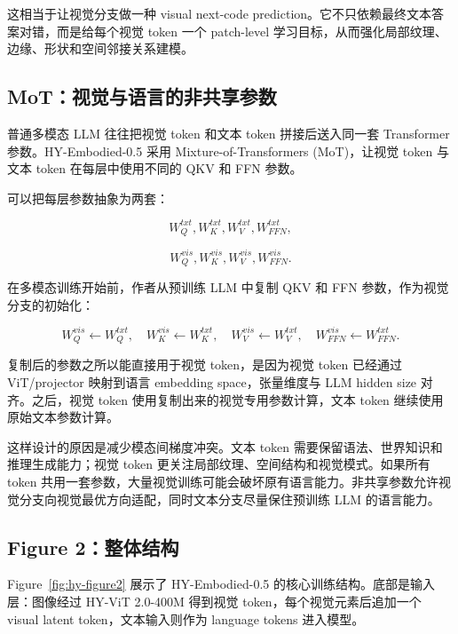 这相当于让视觉分支做一种 visual next-code prediction。它不只依赖最终文本答案对错，而是给每个视觉 token 一个 patch-level 学习目标，从而强化局部纹理、边缘、形状和空间邻接关系建模。

\subsection{MoT：视觉与语言的非共享参数}

普通多模态 LLM 往往把视觉 token 和文本 token 拼接后送入同一套 Transformer 参数。HY-Embodied-0.5 采用 Mixture-of-Transformers (MoT)，让视觉 token 与文本 token 在每层中使用不同的 QKV 和 FFN 参数。

可以把每层参数抽象为两套：

\begin{equation}
    W_Q^{txt}, W_K^{txt}, W_V^{txt}, W_{FFN}^{txt},
\end{equation}

\begin{equation}
    W_Q^{vis}, W_K^{vis}, W_V^{vis}, W_{FFN}^{vis}.
\end{equation}

在多模态训练开始前，作者从预训练 LLM 中复制 QKV 和 FFN 参数，作为视觉分支的初始化：

\begin{equation}
    W_Q^{vis} \leftarrow W_Q^{txt}, \quad
    W_K^{vis} \leftarrow W_K^{txt}, \quad
    W_V^{vis} \leftarrow W_V^{txt}, \quad
    W_{FFN}^{vis} \leftarrow W_{FFN}^{txt}.
\end{equation}

复制后的参数之所以能直接用于视觉 token，是因为视觉 token 已经通过 ViT/projector 映射到语言 embedding space，张量维度与 LLM hidden size 对齐。之后，视觉 token 使用复制出来的视觉专用参数计算，文本 token 继续使用原始文本参数计算。

这样设计的原因是减少模态间梯度冲突。文本 token 需要保留语法、世界知识和推理生成能力；视觉 token 更关注局部纹理、空间结构和视觉模式。如果所有 token 共用一套参数，大量视觉训练可能会破坏原有语言能力。非共享参数允许视觉分支向视觉最优方向适配，同时文本分支尽量保住预训练 LLM 的语言能力。

\subsection{Figure 2：整体结构}

Figure~\ref{fig:hy-figure2} 展示了 HY-Embodied-0.5 的核心训练结构。底部是输入层：图像经过 HY-ViT 2.0-400M 得到视觉 token，每个视觉元素后追加一个 visual latent token，文本输入则作为 language tokens 进入模型。

